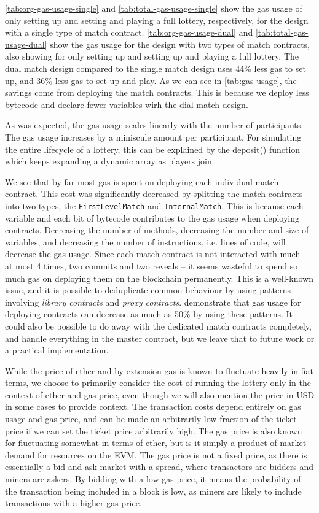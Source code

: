 \noindent
\ref{tab:org-gas-usage-single} and \ref{tab:total-gas-usage-single} show the gas usage of only setting up and setting and playing a full lottery, respectively, for the design with a single type of match contract. \ref{tab:org-gas-usage-dual} and \ref{tab:total-gas-usage-dual} show the gas usage for the design with two types of match contracts, also showing for only setting up and setting up and playing a full lottery.
The dual match design compared to the single match design uses 44\% less gas to set up, and 36\% less gas to set up and play. As we can see in \ref{tab:gas-usage}, the savings come from deploying the match contracts. This is because we deploy less bytecode and declare fewer variables wirh the dial match design.

As was expected, the gas usage scales linearly with the number of participants. The gas usage increases by a miniscule amount per participant. For simulating the entire lifecycle of a lottery, this can be explained by the deposit() function which keeps expanding a dynamic array as players join. 

We see that by far most gas is spent on deploying each individual match contract. This cost was significantly decreased by splitting the match contracts into two types, the \texttt{FirstLevelMatch} and \texttt{InternalMatch}. This is because each variable and each bit of bytecode contributes to the gas usage when deploying contracts. Decreasing the number of methods, decreasing the number and size of variables, and decreasing the number of instructions, i.e. lines of code, will decrease the gas usage. Since each match contract is not interacted with much – at most 4 times, two commits and two reveals – it seems wasteful to spend so much gas on deploying them on the blockchain permanently. This is a well-known issue, and it is possible to deduplicate common behaviour by using patterns involving \emph{library contracts} and \emph{proxy contracts}. \cite{lu_solidity_2018} demonstrate that gas usage for deploying contracts can decrease as much as 50\% by using these patterns. It could also be possible to do away with the dedicated match contracts completely, and handle everything in the master contract, but we leave that to future work or a practical implementation.

While the price of ether and by extension gas is known to fluctuate heavily in fiat terms, we choose to primarily consider the cost of running the lottery only in the context of ether and gas price, even though we will also mention the price in USD in some cases to provide context. The transaction costs depend entirely on gas usage and gas price, and can be made an arbitrarily low fraction of the ticket price if we can set the ticket price arbitrarily high. The gas price is also known for fluctuating somewhat in terms of ether, but is it simply a product of market demand for resources on the EVM. The gas price is not a fixed price, as there is essentially a bid and ask market with a spread, where transactors are bidders and miners are askers. By bidding with a low gas price, it means the probability of the transaction being included in a block is low, as miners are likely to include transactions with a higher gas price.
